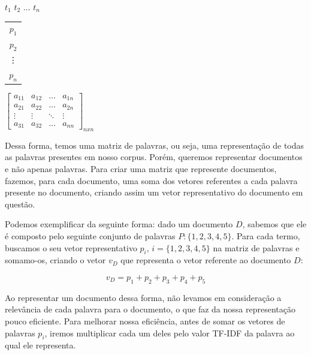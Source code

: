 \documentclass[a4paper,12pt]{article}
\begin{document}
 \begin{center}
 \hspace{0.2cm}$t_{1}$ \hspace{0.5cm} $t_{2}$ \hspace{0.3cm} $\hdots$ \hspace{0.4cm}$t_{n}$
 
 \vspace{0.2cm}
 
\begin{tabular}{c}
   $p_{1}$ \\
   $p_{2}$ \\
   \vdots\\
   $p_{n}$
 \end{tabular}
 $
 \begin{bmatrix}
  a_{11} & a_{12} & \hdots & a_{1n}\\
  a_{21} & a_{22} & \hdots & a_{2n}\\
  \vdots & \vdots & \ddots & \vdots\\
  a_{31} & a_{32} & \hdots & a_{nn}
 \end{bmatrix}_{nxn}
$

\end{center}

Dessa forma, temos uma matriz de palavras, ou seja, uma representação de todas as palavras presentes em nosso corpus.
Porém, queremos representar documentos e não apenas palavras.
Para criar uma matriz que represente documentos, fazemos, para cada documento, uma soma dos vetores referentes a cada palavra presente
no documento, criando assim um vetor representativo do documento em questão.

Podemos exemplificar da seguinte forma: dado um documento $D$, sabemos que ele é composto pelo seguinte conjunto de palavras
$P:\{1,2,3,4,5\}$. Para cada termo, buscamos o seu vetor representativo $p_{i}$, $i =\{1,2,3,4,5\}$ na matriz de
palavras e somamo-os, criando o vetor $v_{D}$ que representa o vetor referente ao documento $D$:

\begin{equation}
  v_{D} = p_{1}+p_{2}+p_{3}+p_{4}+p_{5}
\end{equation}


Ao representar um documento dessa forma, não levamos em consideração a relevância de cada palavra para o documento, o que
faz da nossa representação pouco eficiente. Para melhorar nossa 
eficiência, antes de somar os vetores de palavras $p_{i}$, iremos multiplicar cada um deles pelo valor TF-IDF da palavra
ao qual ele representa.
\end{document}
